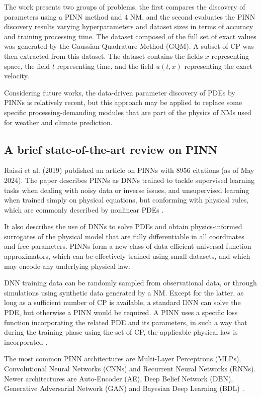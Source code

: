\documentclass[conference]{IEEEtran}
\begin{document}
The work presents two groups of problems, the first compares the discovery of parameters using a PINN method and 4 NM, and the second evaluates the PINN discovery results varying hyperparameters and dataset sizes in terms of accuracy and training processing time. The dataset composed of the full set of exact values was generated by the Gaussian Quadrature Method (GQM). A subset of CP was then extracted from this dataset. The dataset contains the fields $x$ representing space, the field $t$ representing time, and the field $u(t,x)$ representing the exact velocity.

Considering future works, the data-driven parameter discovery of PDEs by PINNs is relatively recent, but this approach may be applied to replace some specific processing-demanding modules that are part of the physics of NMs used for weather and climate prediction. 

\subsection{A brief state-of-the-art review on PINN}

Raissi et al. (2019) \cite{Raissi2019} published an article on PINNs with 8956 citations (as of May 2024). The paper describes PINNs as DNNs trained to tackle supervised learning tasks when dealing with noisy data or inverse issues, and unsupervised learning when trained simply on physical equations, but conforming with physical rules, which are commonly described by nonlinear PDEs \cite{Cuomo2022}.

It also describes the use of DNNs to solve PDEs and obtain physics-informed surrogates of the physical model that are fully differentiable in all coordinates and free parameters. PINNs form a new class of data-efficient universal function approximators, which can be effectively trained using small datasets, and which may encode any underlying physical law. 

DNN training data can be randomly sampled from observational data, or through simulations using synthetic data generated by a NM. Except for the latter, as long as a sufficient number of CP is available, a standard DNN can solve the PDE, but otherwise a PINN would be required. A PINN uses a specific loss function incorporating the related PDE and its parameters, in such a way that during the training phase using the set of CP, the applicable physical law is incorporated \cite{Cuomo2022}.

The most common PINN architectures are Multi-Layer Perceptrons (MLPs), Convolutional Neural Networks (CNNs) and Recurrent Neural Networks (RNNs). Newer architectures are Auto-Encoder (AE), Deep Belief Network (DBN), Generative Adversarial Network (GAN) and Bayesian Deep Learning (BDL) \cite{Vladimirova2018}.
\end{document}
